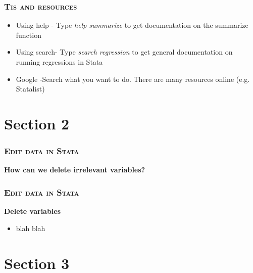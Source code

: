 \documentclass[10pt]{beamer}
\begin{document}
	\begin{frame}
		\frametitle{\textsc{Tis and resources}}
		\begin{itemize}
			\item Using help - Type \textit{help summarize} to get documentation on the summarize function
			\item Using search- Type \textit{search regression} to get general documentation on running regressions in Stata
			\item Google -Search what you want to do. There are many resources online (e.g. Statalist)
			
		\end{itemize}
	\end{frame}
		
\section{Section 2}

	\begin{frame}
		\frametitle{\textsc{Edit data in Stata}}
		\begin{center}
			\textbf{How can we delete irrelevant variables?}
		\end{center}
	\end{frame}

	\begin{frame}[fragile]
		\frametitle{\textsc{Edit data in Stata}}
		\begin{center}
		\Large\textbf{Delete variables}
		\end{center}
		\begin{itemize}
		\item blah blah
		\end{itemize}

\begin{stlog}\end{stlog}
	\end{frame}


	\section{Section 3}

	
\end{document}
